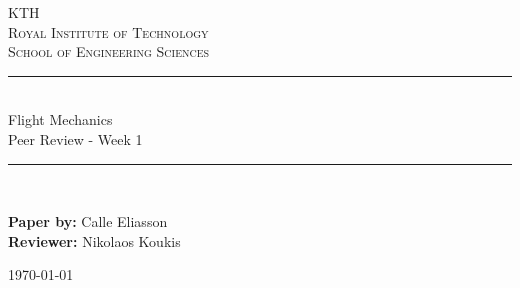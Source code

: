 \newcommand{\horrule}[1]{\rule{\linewidth}{#1}} %

\begin{titlepage}

\begin{center}
\normalfont \normalsize 
\textsc{KTH}\\
\textsc{Royal Institute of Technology} \\  %
\textsc{School of Engineering Sciences} \\ [25pt] %
\horrule{0.5pt} \\[0.4cm] %
\huge Flight Mechanics \vspace{5mm}\\ Peer Review - Week 1 \\ %
\horrule{2pt} \\[0.5cm] %
\vspace*{10mm}
\end{center}

\normalfont \normalsize
\begin{flushleft}
\textbf{Paper by:} Calle Eliasson\\
\textbf{Reviewer:} Nikolaos Koukis\\
\end{flushleft}

\vfill
\begin{center}
    \today
\end{center}
\end{titlepage}
